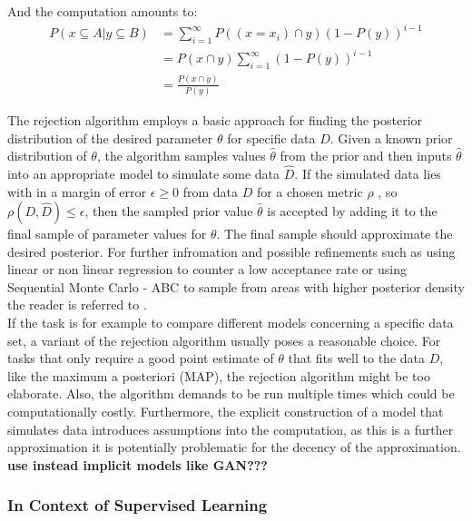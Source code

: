 \documentclass[a4paper, 11pt]{article}
\begin{document}
And the computation amounts to:
\begin{align*}
P(x \subseteq A|y \subseteq B) &= \sum^{\infty}_{i=1} P((x = x_i) \cap y)(1-P(y))^{i-1} \\
&= P(x \cap y)  \sum^{\infty}_{i=1} (1-P(y))^{i-1} \\
&= \frac{P(x \cap y)}{P(y)}
\end{align*}

The rejection algorithm employs a basic approach for finding the posterior distribution of the desired parameter $\theta$ for specific data $D$. Given a known prior distribution of $\theta$, the algorithm samples values $\hat{\theta}$ from the prior and then inputs $\hat{\theta}$ into an appropriate model to simulate some data $\hat{D}$. If the simulated data lies with in a margin of error $\epsilon \geq 0$ from data $D$ for a chosen metric $\rho$ , so $\rho(D, \hat{D}) \leq \epsilon$, then the sampled prior value $\hat{\theta}$ is accepted by adding it to the final sample of parameter values for $\theta$. The final sample should approximate the desired posterior. For further infromation and possible refinements such as using linear or non linear regression to counter a low acceptance rate or using Sequential Monte Carlo - ABC to sample from areas with higher posterior density the reader is referred to \cite{csillery2010approximate}. \\
If the task is for example to compare different models concerning a specific data set, a variant of the rejection algorithm usually poses a reasonable choice. For tasks that only require a good point estimate of $\theta$ that fits well to the data $D$, like the maximum a posteriori (MAP), the rejection algorithm might be too elaborate. Also, the algorithm demands to be run multiple times which could be computationally costly. Furthermore, the explicit construction of a model that simulates data introduces assumptions into the computation, as this is a further approximation it is potentially problematic for the decency of the approximation. \textbf{use instead implicit models like GAN???} \\

\subsubsection{In Context of Supervised Learning}
\end{document}
